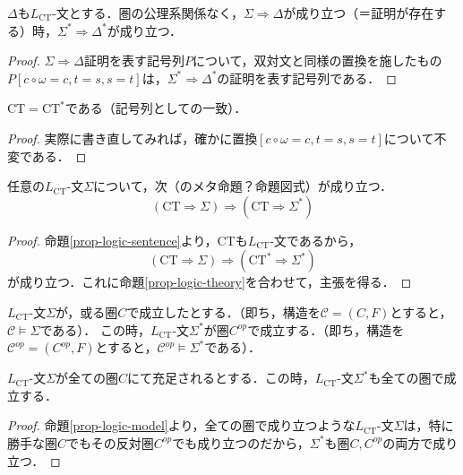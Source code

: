 \documentclass[uplatex, dvipdfmx]{jsreport}
\begin{document}
\begin{proposition*}\label{prop-logic-sentence}
    $\Delta$も$L_{\mathrm{CT}}$-文とする．圏の公理系関係なく，$\Sigma\Rightarrow\Delta$が成り立つ（＝証明が存在する）時，$\Sigma^*\Rightarrow\Delta^*$が成り立つ．
\end{proposition*}
\begin{proof}
    $\Sigma\Rightarrow\Delta$証明を表す記号列$P$について，双対文と同様の置換を施したもの$P[c\circ\omega =c, t=s,s=t]$は，$\Sigma^*\Rightarrow\Delta^*$の証明を表す記号列である．
\end{proof}

\begin{proposition*}\label{prop-logic-theory}
    $\mathrm{CT}=\mathrm{CT}^*$である（記号列としての一致）．
\end{proposition*}
\begin{proof}
    実際に書き直してみれば，確かに置換$[c\circ\omega =c, t=s,s=t]$について不変である．
\end{proof}

\begin{proposition}
    任意の$L_{\mathrm{CT}}$-文$\Sigma$について，次（のメタ命題？命題図式）が成り立つ．
    \[ (\mathrm{CT}\Rightarrow\Sigma) \Rightarrow (\mathrm{CT}\Rightarrow\Sigma^*) \]
\end{proposition}
\begin{proof}
    命題\ref{prop-logic-sentence}より，CTも$L_{\mathrm{CT}}$-文であるから，
    \[ (\mathrm{CT}\Rightarrow\Sigma) \Rightarrow (\mathrm{CT}^*\Rightarrow\Sigma^*) \]
    が成り立つ．これに命題\ref{prop-logic-theory}を合わせて，主張を得る．
\end{proof}

\begin{proposition*}\label{prop-logic-model}
    $L_{\mathrm{CT}}$-文$\Sigma$が，或る圏$C$で成立したとする．（即ち，構造を$\mathcal{C}=(C,F)$とすると，$\mathcal{C}\models\Sigma$である）．
    この時，$L_{\mathrm{CT}}$-文$\Sigma^*$が圏$C^{op}$で成立する．（即ち，構造を$\mathcal{C}^{op}=(C^{op},F)$とすると，$\mathcal{C}^{op}\models\Sigma^*$である）．
\end{proposition*}

\begin{proposition}\label{prop-duality-conceptual}
    $L_{\mathrm{CT}}$-文$\Sigma$が全ての圏$C$にて充足されるとする．この時，$L_{\mathrm{CT}}$-文$\Sigma^*$も全ての圏で成立する．
\end{proposition}
\begin{proof}
    命題\ref{prop-logic-model}より，全ての圏で成り立つような$L_{\mathrm{CT}}$-文$\Sigma$は，特に勝手な圏$C$でもその反対圏$C^{op}$でも成り立つのだから，$\Sigma^*$も圏$C,C^{op}$の両方で成り立つ．
\end{proof}
\end{document}
